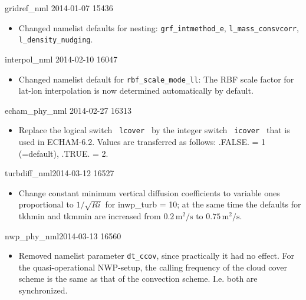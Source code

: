 \begin{changeitem}{gridref\_nml}{ 2014-01-07 }{ 15436 }
  \begin{itemize}
   \item Changed namelist defaults for nesting: \texttt{grf\_intmethod\_e}, \texttt{l\_mass\_consvcorr}, \texttt{l\_density\_nudging}.
  \end{itemize}
\end{changeitem}


\begin{changeitem}{interpol\_nml}{ 2014-02-10 }{ 16047 }
  \begin{itemize}
   \item Changed namelist default for \texttt{rbf\_scale\_mode\_ll}: The RBF scale factor for lat-lon interpolation is now
      determined automatically by default.
  \end{itemize}
\end{changeitem}


\begin{changeitem}{echam\_phy\_nml}{ 2014-02-27 }{ 16313 }
  \begin{itemize}
   \item Replace the logical switch \texttt{ lcover } by the integer switch \texttt{ icover } that is used in ECHAM-6.2. Values are transferred as follows: .FALSE. = 1 (=default), .TRUE. = 2.
  \end{itemize}
\end{changeitem}

\begin{changeitem}{turbdiff\_nml}{2014-03-12 }{16527 }
  \begin{itemize}
   \item Change constant minimum vertical diffusion coefficients to variable ones proportional to $1/\sqrt{Ri}$ for inwp\_turb = 10; at the same time
         the defaults for tkhmin and tkmmin are increased from $0.2 \, \mathrm{m^2/s}$ to $0.75 \, \mathrm{m^2/s}$.
  \end{itemize}
\end{changeitem}

\begin{changeitem}{nwp\_phy\_nml}{2014-03-13 }{16560 }
  \begin{itemize}
   \item Removed namelist parameter \texttt{dt\_ccov}, since practically it had no effect. For the  quasi-operational NWP-setup, the calling frequency of the cloud cover scheme is the same as that of the convection scheme. I.e. both are synchronized.
  \end{itemize}
\end{changeitem}

